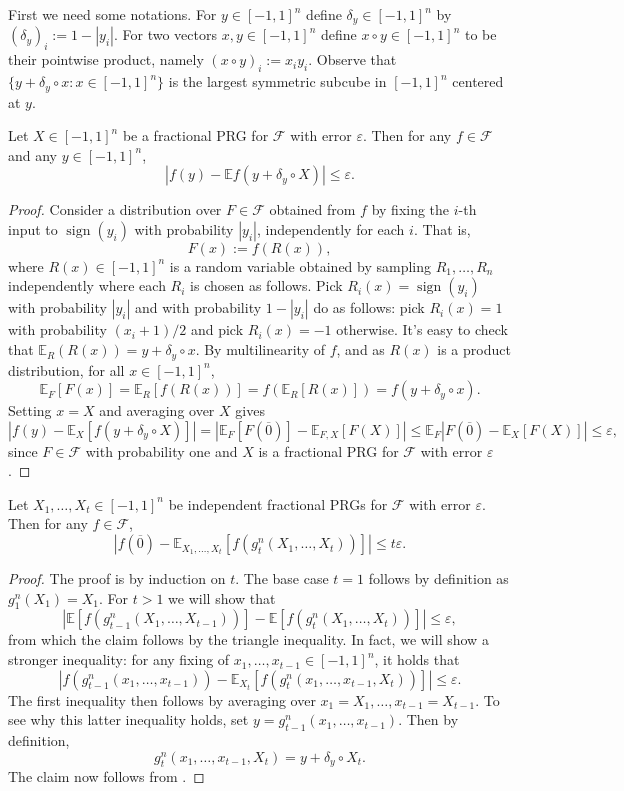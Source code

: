 \documentclass{toc}
\newcommand{\E}{\mathbb{E}}
\newcommand{\FF}{\mathcal{F}}
\newcommand{\eps}{\varepsilon}
\DeclareMathOperator{\sign}{sign}     %
\newcommand{\zero}{\overline{0}}
\begin{document}
First we need some notations.
For $y \in [-1,1]^n$ define $\delta_y \in [-1,1]^n$ by $(\delta_y)_i := 1-|y_i|$. For two vectors $x,y \in [-1,1]^n$ define $x \circ y \in [-1,1]^n$ to be their pointwise product, namely $(x \circ y)_i := x_i y_i$.
Observe that $\{y + \delta_y \circ x: x \in [-1,1]^n\}$ is the largest symmetric subcube in $[-1,1]^n$ centered at $y$.

\begin{claim}
\label{claim:prg_around_nonzero}
Let $X \in [-1,1]^n$ be a fractional PRG for $\FF$ with error $\eps$. Then for any $f \in \FF$ and any $y \in [-1,1]^n$,
$$
\left| f(y) - \E f(y + \delta_y \circ X) \right| \le \eps.
$$
\end{claim}

\begin{proof}
Consider a distribution over $F \in \FF$ obtained from $f$ by fixing the $i$-th input to $\sign(y_i)$ with probability $|y_i|$,
independently for each $i$. That is,
$$
F(x) := f(R(x)),
$$
	where $R(x) \in [-1,1]^n$ is a random variable obtained by sampling $R_1,\ldots,R_n$ independently where
	each $R_i$ is chosen as follows. Pick $R_i(x)=\sign(y_i)$ with probability $|y_i|$ and with probability $1-|y_i|$ do as follows: pick $R_i(x) = 1$ with probability $(x_i+1)/2$ and pick $R_i(x)=-1$ otherwise. It's easy to check that $\E_R(R(x)) = y + \delta_y \circ x$. By  multilinearity of $f$, and as $R(x)$ is a product distribution, for all $x\in [-1,1]^n$,
$$
\E_F[F(x)] = \E_R [f (R(x))] = f( \E_R[R(x)]) = f(y + \delta_y \circ x).
$$
Setting $x=X$ and averaging over $X$ gives
$$
\left| f(y) - \E_X [f(y + \delta_y \circ X)] \right| =
	\left| \E_F [F(\zero)] - \E_{F,X} [F(X)] \right| \le
\E_F \left| F(\zero) - \E_{X} [F(X)] \right| \le \eps,
$$
since $F \in \FF$ with probability one and $X$ is a fractional PRG for $\FF$ with error $\eps$.
\end{proof}

\begin{claim}
\label{claim:gt_error}
Let $X_1,\ldots,X_t \in [-1,1]^n$ be independent fractional PRGs for $\FF$ with error $\eps$. Then for any $f \in \FF$,
$$
\left| f(\zero) - \E_{X_1,\ldots,X_t} [f(g_t^n(X_1,\ldots,X_t))] \right| \le t \eps.
$$
\end{claim}

\begin{proof}
The proof is by induction on $t$. The base case $t=1$ follows by definition as $g_1^n(X_1)=X_1$. For $t>1$ we will show that
$$
\left| \E[f(g_{t-1}^n(X_1,\ldots,X_{t-1}))] - \E [f(g_t^n(X_1,\ldots,X_t))] \right| \le \eps,
$$
from which the claim follows by the triangle inequality. In fact, we will show a stronger inequality: for any fixing of $x_1,\ldots,x_{t-1} \in [-1,1]^n$,
it holds that
$$
\left| f(g_{t-1}^n(x_1,\ldots,x_{t-1})) - \E_{X_t}[ f(g_t^n(x_1,\ldots,x_{t-1},X_t))] \right| \le \eps.
$$
The first inequality then follows by averaging over $x_1=X_1,\ldots,x_{t-1}=X_{t-1}$. To see why this latter inequality holds,
set $y = g_{t-1}^n(x_1,\ldots,x_{t-1})$. Then by definition,
$$
g_t^n(x_1,\ldots,x_{t-1},X_t) = y + \delta_y \circ X_t.
$$
The claim now follows from .
\end{proof}
\end{document}
